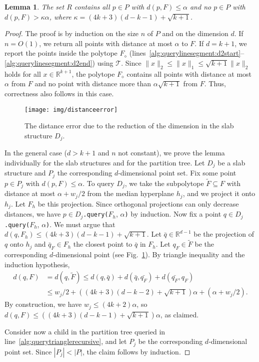 \documentclass[a4paper,11pt]{paper}
\newcommand{\mathset}[1]{\ensuremath {\mathbb {#1}}}
\newcommand{\R}{\mathset{R}}
\newcommand{\lowdimapprox}[1][]{(4k+3)(d#1-k-1)+\sqrt{k+1}}
\newtheorem{lemma}[theorem]{Lemma}
\begin{document}
\begin{lemma}
\label{lem:distancerror}
 The set $R$ contains all $p \in P$ with  $d(p,F) \leq \alpha$ and
 no $p \in P$ with $d(p,F) > \kappa\alpha$, where
 $\kappa=\lowdimapprox$.
\end{lemma}
\begin{proof}
  The proof is  by induction on the size $n$ of $P$ and on
  the dimension $d$.
  If $n = O(1)$, we return all points with distance at most
  $\alpha$ to $F$. If $d=k+1$, we report the
  points inside the polytope
  $F_\diamond$
  (lines~\ref{alg:querylinesegment:d2start}--\ref{alg:querylinesegment:d2end})
  using $\mathcal{T}$.
  Since $\|x\|_2 \leq \|x\|_1 \leq \sqrt{k+1}\|x\|_2$
  holds for all $x\in \R^{k+1}$, the polytope $F_\diamond$ contains
  all points with distance at most $\alpha$ from $F$ and no point
  with distance more than $\alpha\sqrt{k+1}$ from $F$. Thus,
  correctness also follows in this case.

  \begin{figure}[htbp]
    \centering
    \texttt{[image: img/distanceerror]}
    \caption{The distance error due to the reduction of the dimension
      in the slab structure $D_j$.}
    \label{fig:distanceerror}
  \end{figure}

  In the general case  ($d > k+1$ and $n$ not constant), we prove
  the lemma individually for the slab structures and for the
  partition tree.  Let $D_j$ be a slab
  structure and $P_j$ the corresponding $d$-dimensional point set.
  Fix some point $p \in P_j$ with $d(p, F) \leq \alpha$. To
  query $D_j$, we take the subpolytope $\widetilde{F} \subseteq F$
  with distance at most $\alpha + w_j/2$ from the
  median hyperplane $h_j$, and we project it onto $h_j$. Let
  $F_h$ be this projection.
  Since
  orthogonal projections can only
  decrease distances, we have
  $p \in D_j$\texttt{.query(}$F_h$, $\alpha$\texttt{)} by induction.
  Now fix a point $q \in D_j$\texttt{.query(}$F_h$, $\alpha$\texttt{)}.
  We must argue that $d(q, F_h) \leq \lowdimapprox$.
  Let $\bar{q}\in\R^{d-1}$ be the projection of $q$ onto $h_j$
  and $\bar{q}_{F} \in F_h$ the closest point to
  $\bar{q}$ in $F_h$.
  Let $q_F \in \widetilde{F}$ be the corresponding $d$-dimensional
  point (see Fig.~\ref{fig:distanceerror}).
  By triangle inequality and the induction hypothesis,
  \begin{align*}
      d(q,F) &=
        d(q,\widetilde{F}) \leq d(q, \bar{q}) + d(\bar{q}, \bar{q_F}) +
         d(\bar{q_F}, q_F) \\
      & \leq w_j/2 + ((4k+3) (d-k-2) + \sqrt{k+1}) \alpha +
         (\alpha + w_j/2).
  \end{align*}
  By construction, we have $w_j \leq (4k+2)\alpha$, so
  $d(q,F) \leq (\lowdimapprox)\alpha$, as claimed.

  Consider now a child in the partition tree queried in
  line~\ref{alg:querytrianglerecursive}, and let $P_j$ be the
  corresponding $d$-dimensional point set. Since
  $|P_j|  < |P|$, the claim follows by induction.
\end{proof}
\end{document}
